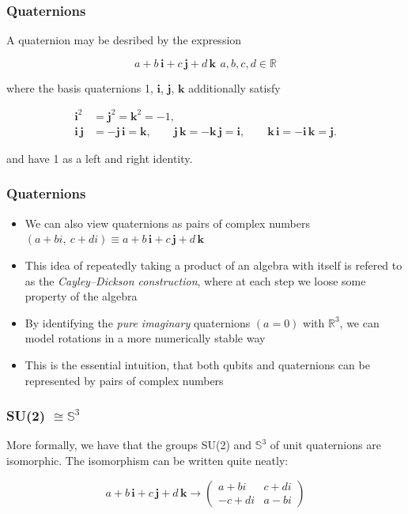 \documentclass{beamer}
\begin{document}
\begin{frame}
\frametitle{Quaternions}

\begin{definition}[Quaternions]
A quaternion may be desribed by the expression

$$
a + b\,\mathbf{i} +  c\,\mathbf{j} + d\,\mathbf{k}\ \, a, b, c, d \in \mathbb{R}
$$

where the basis quaternions 1, $\mathbf{i}$, $\mathbf{j}$, $\mathbf{k}$ additionally satisfy

\begin{align*}
\mathbf i^2 &= \mathbf j^2 = \mathbf k^2 = -1, \\
\mathbf{i\,j} &= - \mathbf{j\,i} = \mathbf k, \qquad
\mathbf{j\,k} = - \mathbf{k\,j} = \mathbf i, \qquad
\mathbf{k\,i} = - \mathbf{i\,k} = \mathbf j.
\end{align*}

and have 1 as a left and right identity.

\end{definition}
\end{frame}

\begin{frame}
\frametitle{Quaternions}


\begin{itemize}
	\item We can also view quaternions as pairs of complex numbers $(a + bi,\ c + di) \equiv a + b\,\mathbf{i} +  c\,\mathbf{j} + d\,\mathbf{k}$
	\item This idea of repeatedly taking a product of an algebra with itself is refered to as the \textit{Cayley–Dickson construction}, where at each step we loose some property of the algebra
	\item By identifying the \textit{pure imaginary} quaternions $(a = 0)$ with $\mathbb{R} ^ 3$, we can model rotations in a more numerically stable way
	\item This is the essential intuition, that both qubits and quaternions can be represented by pairs of complex numbers
\end{itemize}

\end{frame}

\begin{frame}
\frametitle{SU(2) $\cong \mathbb{S} ^ 3 $ }

More formally, we have that the groups SU(2) and $\mathbb{S} ^ 3$ of unit quaternions are isomorphic. The isomorphism can be written quite neatly:

$$
a + b\,\mathbf{i} +  c\,\mathbf{j} + d\,\mathbf{k} \to
\begin{pmatrix}
      a + bi       & c + di \\
			- c + di  &  a - bi
\end{pmatrix}
$$
\end{frame}
\end{document}
